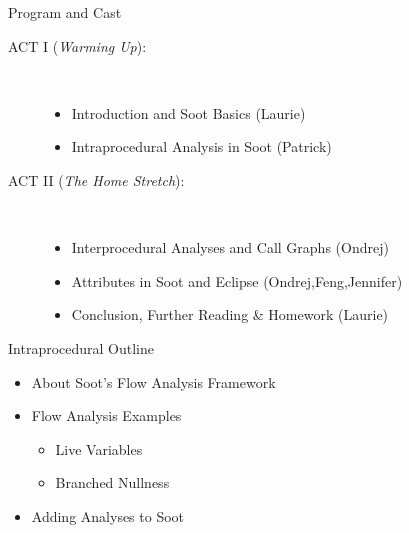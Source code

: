 \begin{slide}{Program and Cast}
\begin{description}
\item[ACT I ({\em Warming Up}):] \hspace{1in} \\
\begin{itemize}
\item Introduction and Soot Basics {\blue (Laurie)}
\item {\red Intraprocedural Analysis in Soot {\blue (Patrick)}}
\end{itemize}
\item[ACT II ({\em The Home Stretch}):] \hspace{1in} \\
\begin{itemize}
\item Interprocedural Analyses and Call Graphs {\blue (Ondrej)}
\item Attributes in Soot and Eclipse {\blue (Ondrej,Feng,Jennifer)}
\item Conclusion, Further Reading \& Homework {\blue (Laurie)}
\end{itemize}
\end{description}
\end{slide}

\begin{slide}{Intraprocedural Outline}
\begin{itemize}
\item About Soot's Flow Analysis Framework
\item Flow Analysis Examples
\begin{itemize} 
\item Live Variables
\item Branched Nullness
\end{itemize}
\item Adding Analyses to Soot
\end{itemize}
\end{slide}


